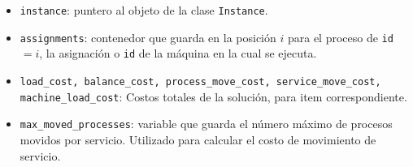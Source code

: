 \documentclass[../informe2.tex]{subfiles}
\begin{document}
\bigskip

\noindent\begin{minipage}{0.5\textwidth}
	\small
	\begin{itemize}
		\item \texttt{instance}: puntero al objeto de la clase \texttt{Instance}.
		\item \texttt{assignments}: contenedor que guarda en la posición $i$ para el proceso de \texttt{id} $=i$, la asignación o \texttt{id} de la máquina en la cual se ejecuta.
		\item \texttt{load\_cost, balance\_cost, process\_move\_cost, service\_move\_cost, machine\_load\_cost}: Costos totales de la solución, para item correspondiente.
		\item \texttt{max\_moved\_processes}: variable que guarda el número máximo de procesos movidos por servicio. Utilizado para calcular el costo de movimiento de servicio.
	\end{itemize}
\end{minipage}\hfill
\begin{minipage}{0.4\textwidth}
\end{minipage}
\end{document}

